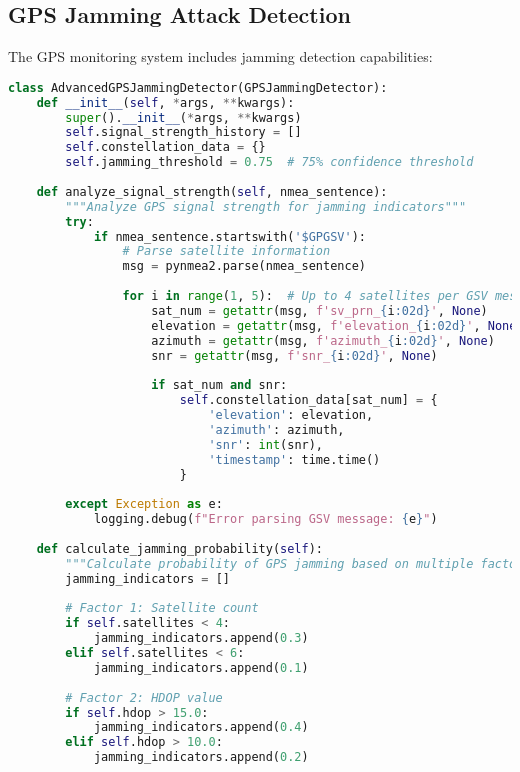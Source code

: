 \documentclass[12pt,a4paper]{report}
\begin{document}
\subsection{GPS Jamming Attack Detection}

The GPS monitoring system includes jamming detection capabilities:

\begin{lstlisting}[language=Python, caption=Enhanced GPS Jamming Detection]
class AdvancedGPSJammingDetector(GPSJammingDetector):
    def __init__(self, *args, **kwargs):
        super().__init__(*args, **kwargs)
        self.signal_strength_history = []
        self.constellation_data = {}
        self.jamming_threshold = 0.75  # 75% confidence threshold
        
    def analyze_signal_strength(self, nmea_sentence):
        """Analyze GPS signal strength for jamming indicators"""
        try:
            if nmea_sentence.startswith('$GPGSV'):
                # Parse satellite information
                msg = pynmea2.parse(nmea_sentence)
                
                for i in range(1, 5):  # Up to 4 satellites per GSV message
                    sat_num = getattr(msg, f'sv_prn_{i:02d}', None)
                    elevation = getattr(msg, f'elevation_{i:02d}', None)
                    azimuth = getattr(msg, f'azimuth_{i:02d}', None)
                    snr = getattr(msg, f'snr_{i:02d}', None)
                    
                    if sat_num and snr:
                        self.constellation_data[sat_num] = {
                            'elevation': elevation,
                            'azimuth': azimuth,
                            'snr': int(snr),
                            'timestamp': time.time()
                        }
                        
        except Exception as e:
            logging.debug(f"Error parsing GSV message: {e}")
    
    def calculate_jamming_probability(self):
        """Calculate probability of GPS jamming based on multiple factors"""
        jamming_indicators = []
        
        # Factor 1: Satellite count
        if self.satellites < 4:
            jamming_indicators.append(0.3)
        elif self.satellites < 6:
            jamming_indicators.append(0.1)
            
        # Factor 2: HDOP value
        if self.hdop > 15.0:
            jamming_indicators.append(0.4)
        elif self.hdop > 10.0:
            jamming_indicators.append(0.2)
            

\end{lstlisting}
\end{document}
